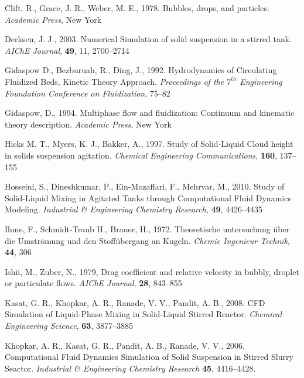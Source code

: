 \begin{thebibliography}{99}
 Clift, R., Grace, J. R., Weber, M. E.,  1978.  Bubbles, drops, and particles. \textit{Academic Press}, New York

 Derksen, J. J., 2003. Numerical Simulation of solid suspension in a stirred tank. \textit{AIChE Journal}, \textbf{49}, 11, 2700--2714

 Gidaspow D., Bezburuah, R., Ding, J., 1992. Hydrodynamics of Circulating Fluidized Beds, Kinetic Theory Approach. \textit{Proceedings of the $7^{th}$ Engineering Foundation Conference on Fluidization}, 75--82

 Gidaspow, D., 1994. Multiphase flow and fluidization: Continuum and kinematic theory description. \textit{Academic Press}, New York

 Hicks M. T., Myers, K. J.,  Bakker, A., 1997. Study of Solid-Liquid Cloud height in solids suspension agitation. \textit{Chemical Engineering Communications}, \textbf{160}, 137--155

 Hosseini, S., Dineshkumar, P., Ein-Mozaffari, F., Mehrvar, M., 2010. Study of Solid-Liquid Mixing in Agitated Tanks through Computational Fluid Dynamics Modeling. \textit{Industrial \& Engineering Chemistry Research}, \textbf{49}, 4426--4435

 Ihme, F., Schmidt-Traub H., Brauer, H., 1972. Theoretische untersuchung \"uber die Umstr\"omung und den Stoff\"ubergang an Kugeln. \textit{Chemie Ingenieur Technik}, \textbf{44}, 306

 Ishii, M., Zuber, N., 1979, Drag coefficient and relative velocity in bubbly, droplet or particulate flows. \textit{AIChE Journal}, \textbf{28}, 843--855 

 Kasat, G. R., Khopkar, A. R., Ranade, V. V., Pandit, A. B., 2008. CFD Simulation of Liquid-Phase Mixing in Solid-Liquid Stirred Reactor. \textit{Chemical Engineering Science}, \textbf{63}, 3877--3885

 Khopkar, A. R., Kasat, G. R., Pandit, A. B., Ranade, V. V., 2006. Computational Fluid Dynamics Simulation of Solid Suspension in Stirred Slurry Seactor. \textit{Industrial \& Engineering Chemistry Research} \textbf{45}, 4416--4428.


\end{thebibliography}
